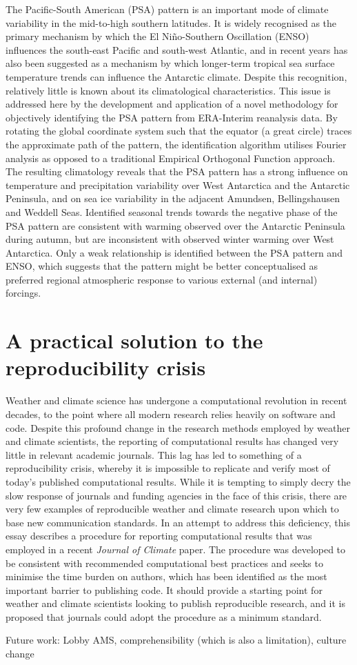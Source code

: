 The Pacific-South American (PSA) pattern is an important mode of climate variability in the mid-to-high southern latitudes. It is widely recognised as the primary mechanism by which the El Ni\~{n}o-Southern Oscillation (ENSO) influences the south-east Pacific and south-west Atlantic, and in recent years has also been suggested as a mechanism by which longer-term tropical sea surface temperature trends can influence the Antarctic climate. Despite this recognition, relatively little is known about its climatological characteristics. This issue is addressed here by the development and application of a novel methodology for objectively identifying the PSA pattern from ERA-Interim reanalysis data. By rotating the global coordinate system such that the equator (a great circle) traces the approximate path of the pattern, the identification algorithm utilises Fourier analysis as opposed to a traditional Empirical Orthogonal Function approach. The resulting climatology reveals that the PSA pattern has a strong influence on temperature and precipitation variability over West Antarctica and the Antarctic Peninsula, and on sea ice variability in the adjacent Amundsen, Bellingshausen and Weddell Seas. Identified seasonal trends towards the negative phase of the PSA pattern are consistent with warming observed over the Antarctic Peninsula during autumn, but are inconsistent with observed winter warming over West Antarctica. Only a weak relationship is identified between the PSA pattern and ENSO, which suggests that the pattern might be better conceptualised as preferred regional atmospheric response to various external (and internal) forcings.


\section{A practical solution to the reproducibility crisis}


Weather and climate science has undergone a computational revolution in recent decades, to the point where all modern research relies heavily on software and code. Despite this profound change in the research methods employed by weather and climate scientists, the reporting of computational results has changed very little in relevant academic journals. This lag has led to something of a reproducibility crisis, whereby it is impossible to replicate and verify most of today's published computational results. While it is tempting to simply decry the slow response of journals and funding agencies in the face of this crisis, there are very few examples of reproducible weather and climate research upon which to base new communication standards. In an attempt to address this deficiency, this essay describes a procedure for reporting computational results that was employed in a recent \textit{Journal of Climate} paper. The procedure was developed to be consistent with recommended computational best practices and seeks to minimise the time burden on authors, which has been identified as the most important barrier to publishing code. It should provide a starting point for weather and climate scientists looking to publish reproducible research, and it is proposed that journals could adopt the procedure as a minimum standard.

Future work: Lobby AMS, comprehensibility (which is also a limitation), culture change



